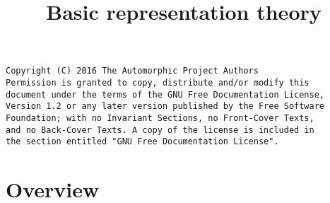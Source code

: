 

%


\title{Basic representation theory}


\maketitle

\label{section-phantom}

\begin{verbatim}
Copyright (C) 2016 The Automorphic Project Authors
Permission is granted to copy, distribute and/or modify this
document under the terms of the GNU Free Documentation License,
Version 1.2 or any later version published by the Free Software
Foundation; with no Invariant Sections, no Front-Cover Texts,
and no Back-Cover Texts. A copy of the license is included in
the section entitled "GNU Free Documentation License".
\end{verbatim}

\tableofcontents


\section{Overview}
\label{section-overview}








